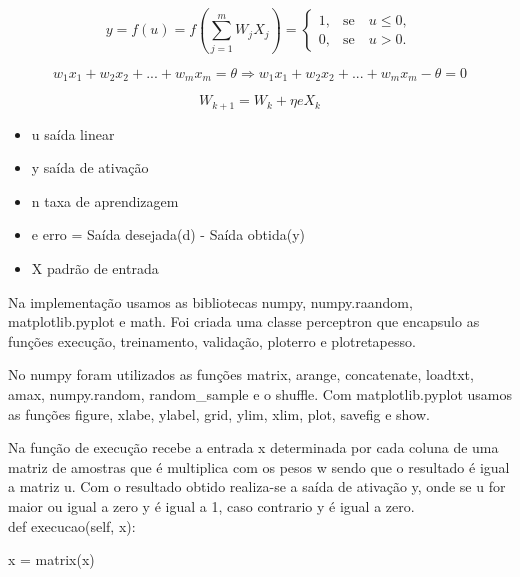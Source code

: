 \documentclass[
12pt, 
a4paper,
oneside,			%
english,			%
french,				%
spanish,			%
brazil,	
]{abntex2}
\begin{document}
	
	
	\begin{equation}
	y = f(u) = f(\sum_{j = 1}^{m} W_{j}X_{j}) = \left\{\begin{array}{rc}
	1,&\mbox{se}\quad u\le 0,\\ 0, &\mbox{se}\quad u>0.
	\end{array}\right.
	\end{equation}
	

	
	
	\begin{equation}
	w_{1}x_{1}+w_{2}x_{2}+...+w_{m}x_{m} = \theta \Rightarrow w_{1}x_{1}+w_{2}x_{2}+...+w_{m}x_{m} - \theta = 0
	\end{equation}
	
	\begin{equation}
	W_{k+1} = W_{k} + \eta e X_{k}
	\end{equation}
	
	\begin{itemize}
		\item u saída linear 
		\item y saída de ativação
		\item n taxa de aprendizagem
		\item e erro = Saída desejada(d) - Saída obtida(y) 
		\item X padrão de entrada
	\end{itemize}
	
	
	
	Na implementação usamos as bibliotecas numpy, numpy.raandom, matplotlib.pyplot e math. Foi criada uma classe perceptron que encapsulo as funções execução, treinamento, validação, ploterro e plotretapesso. 
	
	No numpy foram utilizados as funções matrix, arange, concatenate, loadtxt, amax, numpy.random, random\_sample e o shuffle. Com matplotlib.pyplot usamos as funções figure, xlabe, ylabel, grid, ylim, xlim, plot, savefig e show.
	
	Na função de execução recebe a entrada x determinada por cada coluna de uma matriz de amostras que é multiplica com os pesos w sendo que o resultado é igual a matriz u. Com o resultado obtido realiza-se a saída de ativação y, onde se u for maior ou igual a zero y é igual a 1, caso contrario y é igual a zero. \\
	
	def execucao(self, x):
	
    \setlength{\parindent}{1,5 cm}
    
		 x = matrix(x) 
		        
\end{document}
